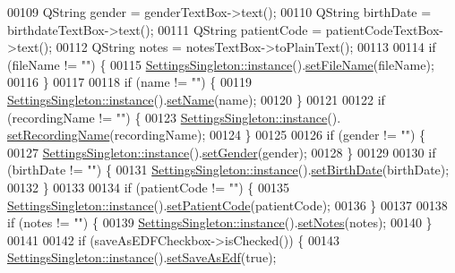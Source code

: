 \begin{DoxyCode}
00109     QString gender = genderTextBox->text();
00110     QString birthDate = birthdateTextBox->text();
00111     QString patientCode = patientCodeTextBox->text();
00112     QString notes = notesTextBox->toPlainText();
00113 
00114     \textcolor{keywordflow}{if} (fileName != \textcolor{stringliteral}{""}) \{
00115         \hyperlink{classSettingsSingleton_aad528becd7ce5903c418a5b8b718074c}{SettingsSingleton::instance}().\hyperlink{classSettingsSingleton_aec045fc249983ef4ac0de4ba8925b300}{setFileName}(fileName);
00116     \}
00117 
00118     \textcolor{keywordflow}{if} (name != \textcolor{stringliteral}{""}) \{
00119         \hyperlink{classSettingsSingleton_aad528becd7ce5903c418a5b8b718074c}{SettingsSingleton::instance}().\hyperlink{classSettingsSingleton_a383c335986ea26502cb65886a9fea1ac}{setName}(name);
00120     \}
00121 
00122     \textcolor{keywordflow}{if} (recordingName != \textcolor{stringliteral}{""}) \{
00123         \hyperlink{classSettingsSingleton_aad528becd7ce5903c418a5b8b718074c}{SettingsSingleton::instance}().
      \hyperlink{classSettingsSingleton_a015183461cfd8c90a1419341e09c7c92}{setRecordingName}(recordingName);
00124     \}
00125 
00126     \textcolor{keywordflow}{if} (gender != \textcolor{stringliteral}{""}) \{
00127         \hyperlink{classSettingsSingleton_aad528becd7ce5903c418a5b8b718074c}{SettingsSingleton::instance}().\hyperlink{classSettingsSingleton_a00746454430a23dc51fd64834e35bf0f}{setGender}(gender);
00128     \}
00129 
00130     \textcolor{keywordflow}{if} (birthDate != \textcolor{stringliteral}{""}) \{
00131         \hyperlink{classSettingsSingleton_aad528becd7ce5903c418a5b8b718074c}{SettingsSingleton::instance}().\hyperlink{classSettingsSingleton_a1b23c39146607ea723fc97f570e6e3e1}{setBirthDate}(birthDate);
00132     \}
00133 
00134     \textcolor{keywordflow}{if} (patientCode != \textcolor{stringliteral}{""}) \{
00135         \hyperlink{classSettingsSingleton_aad528becd7ce5903c418a5b8b718074c}{SettingsSingleton::instance}().\hyperlink{classSettingsSingleton_a43d597e9d39a9b76a11c4575d8d71adc}{setPatientCode}(patientCode);
00136     \}
00137 
00138     \textcolor{keywordflow}{if} (notes != \textcolor{stringliteral}{""}) \{
00139         \hyperlink{classSettingsSingleton_aad528becd7ce5903c418a5b8b718074c}{SettingsSingleton::instance}().\hyperlink{classSettingsSingleton_ac9c888265f360f1fe7ee3fb9441dd514}{setNotes}(notes);
00140     \}
00141 
00142     \textcolor{keywordflow}{if} (saveAsEDFCheckbox->isChecked()) \{
00143         \hyperlink{classSettingsSingleton_aad528becd7ce5903c418a5b8b718074c}{SettingsSingleton::instance}().\hyperlink{classSettingsSingleton_adb4221d2f742cff29038bfda74cfc784}{setSaveAsEdf}(\textcolor{keyword}{true});

\end{DoxyCode}
